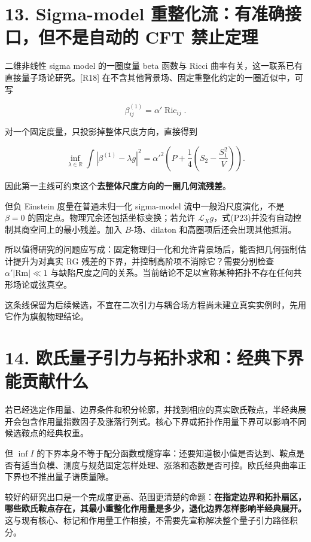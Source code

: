 \documentclass[UTF8,a4paper,11pt,fontset=fandol]{ctexart}
\begin{document}
\section{13. Sigma-model 重整化流：有准确接口，但不是自动的 CFT
禁止定理}\label{sigma-model-ux91cdux6574ux5316ux6d41ux6709ux51c6ux786eux63a5ux53e3ux4f46ux4e0dux662fux81eaux52a8ux7684-cft-ux7981ux6b62ux5b9aux7406}

二维非线性 sigma model 的一圈度量 beta 函数与 Ricci
曲率有关，这一联系已有直接量子场论研究。{[}R18{]}
在不含其他背景场、固定重整化约定的一圈近似中，可写

\[
\beta^{(1)}_{ij}=\alpha'\operatorname{Ric}_{ij}.
\]

对一个固定度量，只投影掉整体尺度方向，直接得到

\[
\boxed{
\inf_{\lambda\in\mathbb R}\int|\beta^{(1)}-\lambda g|^2
=\alpha'^2\left(P+\frac14\left(S_2-\frac{S_1^2}{V}\right)\right).
}
\tag{P23}
\]

因此第一主线可约束这个\textbf{去整体尺度方向的一圈几何流残差}。

但负 Einstein 度量在普通未归一化 sigma-model 流中一般沿尺度演化，不是
\(\beta=0\) 的固定点。物理冗余还包括坐标变换；若允许
\(\mathcal L_Xg\)，式(P23)并没有自动控制其商空间上的最小残差。加入
\(B\)-场、dilaton 和高圈项后还会出现其他抵消。

所以值得研究的问题应写成：固定物理归一化和允许背景场后，能否把几何强制估计提升为对真实
RG 残差的下界，并控制高阶项不消除它？需要分别检查
\(\alpha'|\mathrm{Rm}|\ll1\)
与缺陷尺度之间的关系。当前结论不足以宣称某种拓扑不存在任何共形场论或弦真空。

这条线保留为后续候选，不宜在二次引力与耦合场方程尚未建立真实实例时，先用它作为旗舰物理结论。

\section{14.
欧氏量子引力与拓扑求和：经典下界能贡献什么}\label{ux6b27ux6c0fux91cfux5b50ux5f15ux529bux4e0eux62d3ux6251ux6c42ux548cux7ecfux5178ux4e0bux754cux80fdux8d21ux732eux4ec0ux4e48}

若已经选定作用量、边界条件和积分轮廓，并找到相应的真实欧氏鞍点，半经典展开会包含作用量指数因子及涨落行列式。核心下界或拓扑作用量下界可以影响不同候选鞍点的经典权重。

但 \(\inf I\)
的下界本身不等于配分函数或隧穿率：还要知道极小值是否达到、鞍点是否有适当负模、测度与规范固定怎样处理、涨落和态数是否可控。欧氏经典曲率正下界也不推出量子谱质量隙。

较好的研究出口是一个完成度更高、范围更清楚的命题：\textbf{在指定边界和拓扑扇区，哪些欧氏鞍点存在，其最小重整化作用量是多少，退化边界怎样影响半经典展开。}这与现有核心、标记和作用量工作相接，不需要先宣称解决整个量子引力路径积分。
\end{document}
